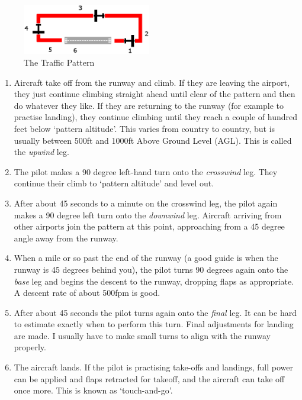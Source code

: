 \begin{figure}[!htp]
\centering
\includegraphics[width=0.5\textwidth]{pattern}
\caption{The Traffic Pattern\label{pattern}}
\end{figure}

\begin{enumerate}
\item Aircraft take off from the runway and climb. If they are leaving the
airport, they just continue climbing straight ahead until clear of the
pattern and then do whatever they like. If they are returning to the runway
(for example to practise landing), they continue climbing until they reach a
couple of hundred feet below `pattern altitude'. This varies from country to
country, but is usually between 500ft and 1000ft Above Ground Level (AGL).
This is called the \emph{upwind} leg.

\item The pilot makes a 90 degree left-hand turn onto the \emph{crosswind} leg.
They continue their climb to `pattern altitude' and level out.

\item After about 45 seconds to a minute on the crosswind leg,
the pilot again makes a 90 degree left turn onto the \emph{downwind} leg.
Aircraft arriving from other airports join the pattern at this point,
approaching from a 45 degree angle away from the runway.

\item When a mile or so past the end of the runway (a good guide is when the
runway is 45 degrees behind you), the pilot turns 90 degrees again onto the
\emph{base} leg and begins the descent to the runway, dropping flaps as appropriate.
A descent rate of about 500fpm is good.

\item After about 45 seconds the pilot turns again onto the \emph{final} leg.
It can be hard to estimate exactly when to perform this turn.
Final adjustments for landing are made.
I usually have to make small turns to align with the runway properly.

\item The aircraft lands. If the pilot is practising take-offs and landings,
full power can be applied and flaps retracted for takeoff, and the aircraft
can take off once more. This is known as `touch-and-go'.

\end{enumerate}

